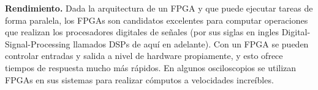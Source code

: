 \documentclass[twoside,spanish,ESP,MSc]{plantillaLabUPV}
\theoremstyle{definition}
\newcommand{\f}{FPGA }
\newcommand{\fs}{FPGAs }
\begin{document}
%

\checkmark\textbf{Rendimiento.} Dada la arquitectura de un \f y que puede ejecutar tareas de forma paralela, los \fs son candidatos excelentes para computar operaciones que realizan los procesadores digitales de señales (por sus siglas en ingles Digital-Signal-Processing llamados DSPs de aquí en adelante). Con un \f se pueden controlar entradas y salida a nivel de hardware propiamente, y esto ofrece tiempos de respuesta mucho más rápidos. En algunos osciloscopios se utilizan \fs en sus sistemas para realizar cómputos a velocidades increíbles.



\end{document}
